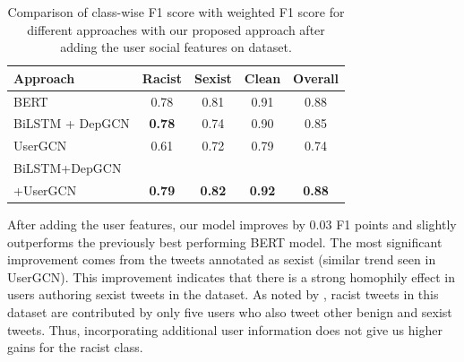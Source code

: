 \begin{table}[tbh]
  \centering
  \small
  \setlength{\tabcolsep}{2pt}
\begin{tabular}{ p{35mm} | c c  c c}
\toprule
 Approach &  Racist & Sexist & Clean & Overall \\
  \midrule
 BERT & 0.78 & 0.81 & 0.91 & 0.88 \\
 BiLSTM + DepGCN & \textbf{0.78} & 0.74 & 0.90 & 0.85 \\
 UserGCN & 0.61 & 0.72 & 0.79 & 0.74 \\
 BiLSTM+DepGCN \\ +UserGCN & \textbf{0.79} & \textbf{0.82} & \textbf{0.92} & \textbf{0.88} \\

 \bottomrule
\end{tabular}
\caption{\label{tab:waseemuser} Comparison of class-wise F1 score with weighted F1 score for different approaches with our proposed approach after adding the user social features on \citet{waseem-hovy-2016} dataset.}
\end{table}

After adding the user features, our model improves by 0.03 F1 points and slightly outperforms the previously best performing BERT model. The most significant improvement comes from the tweets annotated as sexist (similar trend seen in UserGCN). This improvement indicates that there is a strong homophily effect in users authoring sexist tweets in the dataset. As noted by \citet{mishra2019abusive}, racist tweets in this dataset are contributed by only five users who also tweet other benign and sexist tweets. Thus, incorporating additional user information does not give us higher gains for the racist class.
